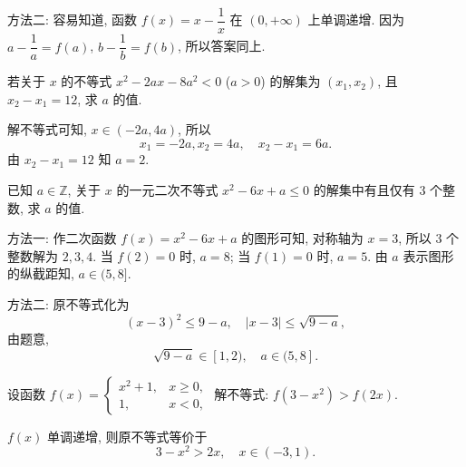    方法二: 容易知道, 函数 $f(x)= x- \dfrac1x$
    在 $(0,+\infty)$ 上单调递增. 因为 $a-\dfrac1a= f(a)$, $b-\dfrac1b= f(b)$, 所以答案同上. 
\endsolution

\begin{exercise}
    若关于 $x$ 的不等式 $x^2 -2ax-8a^2 <0$ ($a>0$) 的解集为 $(x_1,x_2)$, 且 $x_2-x_1=12$, 求 $a$ 的值.
\end{exercise}
\beginsolution
    解不等式可知, $x\in (-2a,4a)$, 所以
    \[x_1= -2a, x_2= 4a,\quad x_2-x_1= 6a.\]
    由 $x_2-x_1=12$ 知 $a= 2$.
\endsolution

\begin{exercise}
    已知 $a\in\mathbb{Z}$, 关于 $x$ 的一元二次不等式 $x^2 -6x+a\leqslant0$  的解集中有且仅有 $3$ 个整数, 求 $a$ 的值.
\end{exercise}
\beginsolution
    方法一: 作二次函数 $f(x)= x^2 -6x+a$ 的图形可知, 对称轴为 $x=3$, 所以 $3$ 个整数解为 $2,3,4$. 当 $f(2)= 0$ 时, $a=8$; 当 $f(1)= 0$ 时, $a=5$. 由 $a$ 表示图形的纵截距知, $a\in (5,8]$.

    方法二: 原不等式化为
    \[(x-3)^2\leqslant 9-a,\quad |x-3|\leqslant \sqrt{9-a},\]
    由题意, 
    \[\sqrt{9-a}\in [1,2),\quad a\in(5,8].\]
\endsolution

\begin{exercise}
    设函数 $f(x)=\begin{cases}
      x^2+1, & x\geqslant 0,\\
      1, & x<0,\end{cases}$
    解不等式: $f(3-x^2)>f(2x)$.
\end{exercise}
\beginsolution
    $f(x)$ 单调递增, 则原不等式等价于
    \[3-x^2> 2x,\quad x\in (-3,1).\]
\endsolution